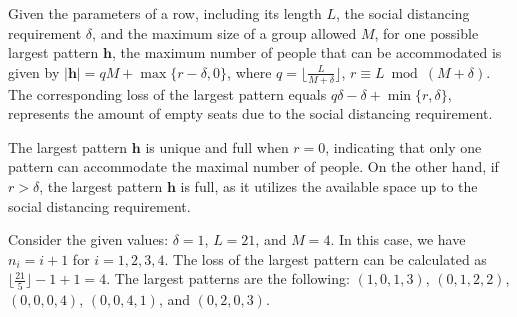 \begin{prop}\label{lem_pattern}
Given the parameters of a row, including its length $L$, the social distancing requirement $\delta$, and the maximum size of a group allowed $M$, for one possible largest pattern $\bm{h}$, the maximum number of people that can be accommodated is given by $|\bm{h}| = qM + \max\{r-\delta, 0\}$, where $q = \lfloor \frac{L}{M + \delta} \rfloor$, $r \equiv L \bmod (M + \delta)$. The corresponding loss of the largest pattern equals $q \delta - \delta + \min\{r, \delta\}$, represents the amount of empty seats due to the social distancing requirement. 
\end{prop}

The largest pattern $\bm{h}$ is unique and full when $r = 0$, indicating that only one pattern can accommodate the maximal number of people. On the other hand, if $r > \delta$, the largest pattern $\bm{h}$ is full, as it utilizes the available space up to the social distancing requirement.



\begin{example}
Consider the given values: $\delta = 1$, $L = 21$, and $M = 4$. In this case, we have $n_i = i + 1$ for $i = 1, 2, 3, 4$. The loss of the largest pattern can be calculated as $\lfloor \frac{21}{5} \rfloor - 1 + 1 = 4$. The largest patterns are the following: $(1, 0, 1, 3)$, $(0, 1, 2, 2)$, $(0, 0, 0, 4)$, $(0, 0, 4, 1)$, and $(0, 2, 0, 3)$. 
\end{example}

